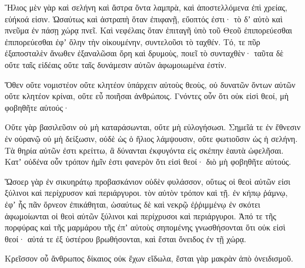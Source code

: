 {\par }{\PP {}Ἥλιος μὲν γὰρ καὶ σελήνη καὶ ἄστρα ὄντα λαμπρὰ, καὶ ἀποστελλόμενα ἐπὶ χρείας, εὐήκοά εἰσιν.
Ὡσαύτως καὶ ἀστραπὴ ὅταν ἐπιφανῇ, εὔοπτός ἐστι· τὸ δʼ αὐτὸ καὶ πνεῦμα ἐν πάσῃ χώρᾳ πνεῖ.
Καὶ νεφέλαις ὅταν ἐπιταγῆ ὑπὸ τοῦ Θεοῦ ἐπιπορεύεσθαι ἐπιπορεύεσθαι ἐφʼ ὅλην τὴν οἰκουμένην, συντελοῦσι τὸ ταχθέν.
Τό, τε πῦρ ἐξαποσταλὲν ἄνωθεν ἐξαναλῶσαι ὄρη καὶ δρυμοὺς, ποιεῖ τὸ συνταχθὲν· ταῦτα δὲ οὔτε ταῖς εἰδέαις οὔτε ταῖς δυνάμεσιν αὐτῶν ἀφωμοιωμένα ἐστίν.
\par }{\PP {}Ὅθεν οὔτε νομιστέον οὔτε κλητέον ὑπάρχειν αὐτοὺς θεοὺς, οὐ δυνατῶν ὄντων αὐτῶν οὔτε κλητέον κρίναι, οὔτε εὖ ποιῆσαι ἀνθρώποις.
Γνόντες οὖν ὅτι οὐκ εἰσὶ θεοί, μὴ φοβηθῆτε αὐτούς·
\par }{\PP {}Οὔτε γὰρ βασιλεῦσιν οὐ μὴ καταράσωνται, οὔτε μὴ εὐλογήσωσι.
Σημεῖά τε ἐν ἔθνεσιν ἐν οὐρανῷ οὐ μὴ δείξωσιν, οὐδὲ ὡς ὁ ἥλιος λάμψουσιν, οὔτε φωτιοῦσιν ὡς ἡ σελήνη.
Τὰ θηρία αὐτῶν ἐστι κρείττω, ἃ δύνανται ἐκφυγόντα εἰς σκέπην ἑαυτὰ ὠφελῆσαι.
Κατʼ οὐδένα οὖν τρόπον ἡμῖν ἑστι φανερὸν ὅτι εἰσὶ θεοί· διὸ μὴ φοβηθῆτε αὐτούς.
\par }{\PP {}Ὥσοερ γὰρ ἐν σικυηράτῳ προβασκάνιον οὐδὲν φυλάσσον, οὕτως οἱ θεοὶ αὐτῶν εἰσι ξύλινοι καὶ περίχρυσον καὶ περιάργυροι.
τὸν αὐτὸν τρόπον καὶ τῇ. ἐν κήπῳ ῥάμνῳ, ἐφʼ ἧς πᾶν ὄρνεον ἐπικάθηται, ὡσαύτως δὲ καὶ νεκρῷ ἐῤῥιμμένῳ ἐν σκότει ἀφωμοίωνται οἱ θεοὶ αὐτῶν ξύλινοι καὶ περίχρυσοι καὶ περιάργυροι.
Ἀπό τε τῆς πορφύρας καὶ τῆς μαρμάρου τῆς ἐπʼ αὐτοὺς σηπομένης γνωσθήσονται ὅτι οὐκ εἰσὶ θεοί· αὐτά τε ἐξ ὑστέρου βρωθήσονται, καὶ ἔσται ὄνειδος ἐν τῇ χώρᾳ.
\par }{\PP {}Κρεῖσσον οὖ ἄνθρωπος δίκαιος οὐκ ἔχων εἴδωλα, ἔσται γὰρ μακρὰν ἀπὸ ὀνειδισμοῦ.
\par }